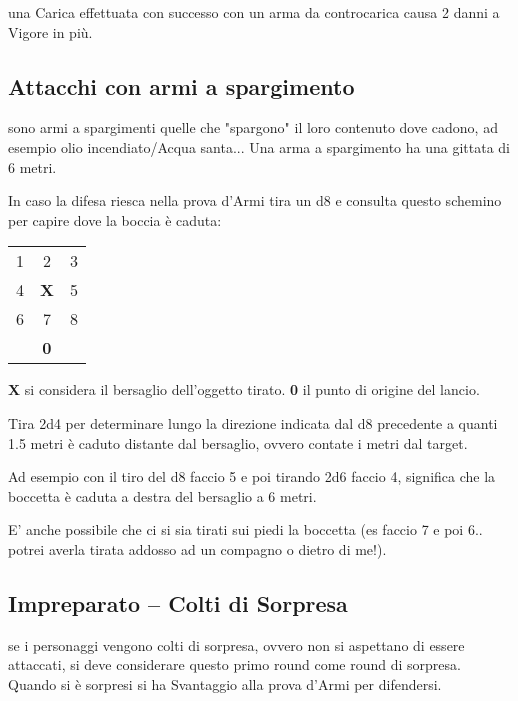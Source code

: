 \documentclass[12pt,a4paper,twoside,openany]{book}
\begin{document}
\begin{multicols}{2}
una Carica effettuata con successo con un arma da controcarica causa 2 danni a Vigore in più.

\subsection{Attacchi con armi a spargimento} \label{attacchiarmidaspargimento}\hypertarget{spargimento}{}

sono armi a spargimenti quelle che "spargono" il loro contenuto dove cadono, ad esempio olio incendiato/Acqua santa... Una arma a spargimento ha una gittata di 6 metri.

In caso la difesa riesca nella prova d'Armi tira un d8 e consulta questo schemino per capire dove la boccia è caduta:

\medskip

\begin{tabularx}{0.30\textwidth}{ccc}
1& 2& 3\\
4 &\textbf{X}& 5\\
6 &7 &8\\
&\textbf{0}&\\
\end{tabularx}

\smallskip

\textbf{X} si considera il bersaglio dell'oggetto tirato. \textbf{0} il punto di origine del lancio.

Tira 2d4 per determinare lungo la direzione indicata dal d8 precedente a quanti 1.5 metri è caduto distante dal bersaglio, ovvero contate i metri dal target.

Ad esempio con il tiro del d8 faccio 5 e poi tirando 2d6 faccio 4, significa che la boccetta è caduta a destra del bersaglio a 6 metri.

E' anche possibile che ci si sia tirati sui piedi la boccetta (es faccio 7 e poi 6.. potrei averla tirata addosso ad un compagno o dietro di me!).


\subsection{Impreparato -- Colti di Sorpresa}\label{coltidisorpresa}

se i personaggi vengono colti di sorpresa, ovvero non si aspettano di essere attaccati, si deve considerare questo primo round come round di sorpresa. Quando si è sorpresi si ha Svantaggio alla prova d'Armi per difendersi.


\end{multicols}
\end{document}
